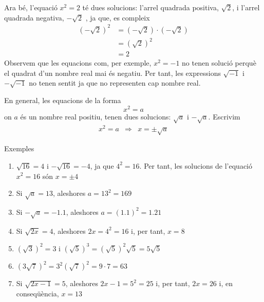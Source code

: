 Ara bé, l’equació $x^{2}=2$ té dues solucions: l’arrel
quadrada positiva, $\sqrt{2}$, i l’arrel quadrada negativa, $-\sqrt{2}$%
, ja que, es compleix%
\begin{align*}
\left( -\sqrt{2}\right) ^{2} &=\left( -\sqrt{2}\right) \cdot \left( -\sqrt{2%
}\right) \\
&=\left( \sqrt{2}\right) ^{2} \\
&=2
\end{align*}%
Observem que les equacions com, per exemple, $x^{2}=-1$ no tenen solució perquè el quadrat d’un nombre real mai és negatiu. Per
tant, les expressions $\sqrt{-1}$ i $-\sqrt{-1}$ no tenen sentit ja que
no representen cap nombre real.

En general, les equacions de la forma%
\begin{equation*}
x^{2}=a
\end{equation*}%
on $a$ és un nombre real positiu, tenen dues solucions: $\sqrt{a}
$ i $-\sqrt{a}$. Escrivim%
\begin{equation*}
\begin{array}{ccc}
x^{2}=a & \Longrightarrow & x=\pm \sqrt{a}%
\end{array}%
\end{equation*}

Exemples

\begin{enumerate}
\item $\sqrt{16}=4$ i $-\sqrt{16}=-4$, ja que $4^{2}=16$. Per tant, les
solucions de l’equació $x^{2}=16$ són $x=\pm 4$

\item Si $\sqrt{a}=13$, aleshores $a=13^{2}=169$

\item Si $-\sqrt{a}=-1.1$, aleshores $a=(1.1)^{2}=1.21$

\item Si $\sqrt{2x}=4$, aleshores $2x=4^{2}=16$ i, per tant, $x=8$

\item $\left( \sqrt{3}\right) ^{2}=3$ i $\left( \sqrt{5}\right) ^{3}=\left( 
\sqrt{5}\right) ^{2}\sqrt{5}=5\sqrt{5}$

\item $\left( 3\sqrt{7}\right) ^{2}=3^{2}\left( \sqrt{7}\right) ^{2}=9\cdot
7=63$

\item Si $\sqrt{2x-1}=5$, aleshores $2x-1=5^{2}=25$ i, per tant, $2x=26$ i,
en conseqüència, $x=13$
\end{enumerate}

